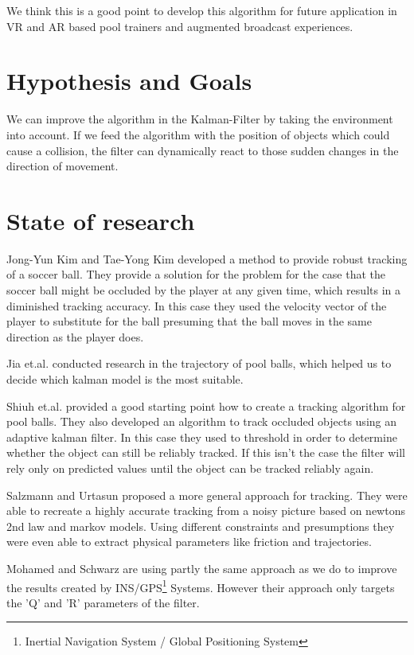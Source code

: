 \documentclass[titlepage, a4paper, 11pt]{scrartcl}
\begin{document}
\begin{multicols}{2}
    We think this is a good point to develop this algorithm for future application in VR and AR based pool trainers and augmented broadcast experiences.

    \section{Hypothesis and Goals}

    We can improve the algorithm in the Kalman-Filter by taking the environment into account.
    If we feed the algorithm with the position of objects which could cause a collision,
    the filter can dynamically react to those sudden changes in the direction of movement.

    \section{State of research}

    Jong-Yun Kim and Tae-Yong Kim \cite{kim} developed a method to provide robust tracking of a soccer ball. 
    They provide a solution for the problem for the case that the soccer ball might be occluded by the player at any given time,
    which results in a diminished tracking accuracy. 
    In this case they used the velocity vector of the player to substitute for the ball presuming that the ball moves in the same direction as the player does.

    Jia et.al. \cite{jia} conducted research in the trajectory of pool balls, which helped us to decide which kalman model is the most suitable.

    Shiuh et.al. \cite{shiuh} provided a good starting point how to create a tracking algorithm for pool balls. They also developed an algorithm to track occluded objects using an adaptive kalman filter.
    In this case they used to threshold in order to determine whether the object can still be reliably tracked. If this isn't the case the filter will rely only on predicted values until the object can be tracked reliably again.

    Salzmann and Urtasun \cite{salzmann} proposed a more general approach for tracking. 
    They were able to recreate a highly accurate tracking from a noisy picture based on newtons 2nd law and markov models.
    Using different constraints and presumptions they were even able to extract physical parameters like friction and trajectories.

    Mohamed and Schwarz \cite{schwarz} are using partly the same approach as we do to improve the results created by INS/GPS\footnote{Inertial Navigation System / Global Positioning System} Systems.
    However their approach only targets the 'Q' and 'R' parameters of the filter.


\end{multicols}
\end{document}
